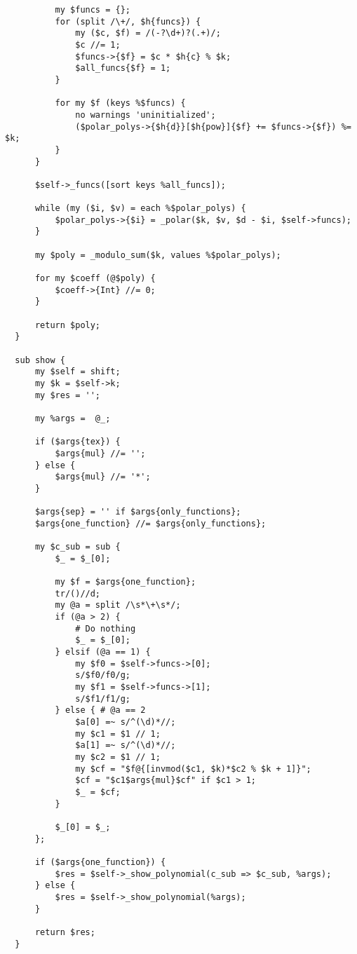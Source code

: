 \documentclass[bibliography=totoc, a4paper, 14pt]{extarticle}
\begin{document}
\begin{footnotesize}
\begin{verbatim}
          my $funcs = {};
          for (split /\+/, $h{funcs}) {
              my ($c, $f) = /(-?\d+)?(.+)/;
              $c //= 1;
              $funcs->{$f} = $c * $h{c} % $k;
              $all_funcs{$f} = 1;
          }

          for my $f (keys %$funcs) {
              no warnings 'uninitialized';
              ($polar_polys->{$h{d}}[$h{pow}]{$f} += $funcs->{$f}) %= $k;
          }
      }

      $self->_funcs([sort keys %all_funcs]);

      while (my ($i, $v) = each %$polar_polys) {
          $polar_polys->{$i} = _polar($k, $v, $d - $i, $self->funcs);
      }

      my $poly = _modulo_sum($k, values %$polar_polys);

      for my $coeff (@$poly) {
          $coeff->{Int} //= 0;
      }

      return $poly;
  }

  sub show {
      my $self = shift;
      my $k = $self->k;
      my $res = '';

      my %args =  @_;

      if ($args{tex}) {
          $args{mul} //= '';
      } else {
          $args{mul} //= '*';
      }

      $args{sep} = '' if $args{only_functions};
      $args{one_function} //= $args{only_functions};

      my $c_sub = sub {
          $_ = $_[0];

          my $f = $args{one_function};
          tr/()//d;
          my @a = split /\s*\+\s*/;
          if (@a > 2) {
              # Do nothing
              $_ = $_[0];
          } elsif (@a == 1) {
              my $f0 = $self->funcs->[0];
              s/$f0/f0/g;
              my $f1 = $self->funcs->[1];
              s/$f1/f1/g;
          } else { # @a == 2
              $a[0] =~ s/^(\d)*//;
              my $c1 = $1 // 1;
              $a[1] =~ s/^(\d)*//;
              my $c2 = $1 // 1;
              my $cf = "$f@{[invmod($c1, $k)*$c2 % $k + 1]}";
              $cf = "$c1$args{mul}$cf" if $c1 > 1;
              $_ = $cf;
          }

          $_[0] = $_;
      };

      if ($args{one_function}) {
          $res = $self->_show_polynomial(c_sub => $c_sub, %args);
      } else {
          $res = $self->_show_polynomial(%args);
      }

      return $res;
  }


\end{verbatim}
\end{footnotesize}
\end{document}
